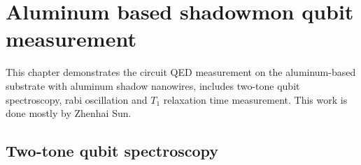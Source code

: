 \clearpage
\section{Aluminum based shadowmon qubit measurement}

This chapter demonstrates the circuit QED measurement on the aluminum-based substrate with aluminum shadow nanowires, includes two-tone qubit spectroscopy, rabi oscillation and $T_1$ relaxation time measurement. This work is done mostly by Zhenhai Sun.

\subsection{Two-tone qubit spectroscopy}